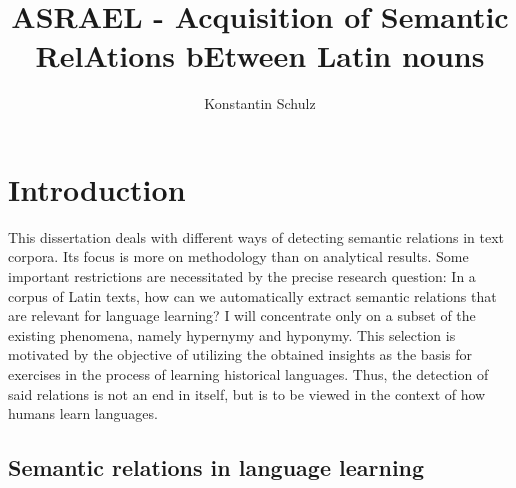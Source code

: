 \documentclass[jou]{apa6} %
\title{ASRAEL - Acquisition of Semantic RelAtions bEtween Latin nouns}
\author{Konstantin Schulz}
\affiliation{Humboldt-Universität zu Berlin}
\begin{document}
\maketitle    
\tableofcontents
\listoffigures
\listoftables
                        
\section{Introduction}

This dissertation deals with different ways of detecting semantic relations in text corpora. Its focus is more on methodology than on analytical results. Some important restrictions are necessitated by the precise research question: In a corpus of Latin texts, how can we automatically extract semantic relations that are relevant for language learning? I will concentrate only on a subset of the existing phenomena, namely hypernymy and hyponymy. This selection is motivated by the objective of utilizing the obtained insights as the basis for exercises in the process of learning historical languages. Thus, the detection of said relations is not an end in itself, but is to be viewed in the context of how humans learn languages. 

\subsection{Semantic relations in language learning}
\end{document}
